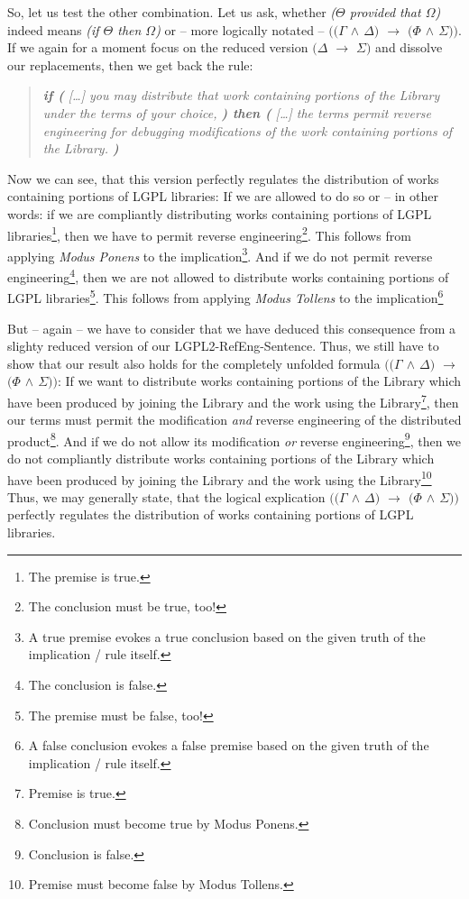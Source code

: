 So, let us test the other combination. Let us ask, whether \emph{($\Theta$
provided that $\Omega$)} indeed means \emph{(if $\Theta$ then $\Omega$)} or --
more logically notated -- \emph{$((\Gamma$ $\wedge$ $\Delta)$ $\rightarrow$ $(\Phi$
$\wedge$ $\Sigma))$}. If we again for a moment focus on the reduced version
\emph{$(\Delta$ $\rightarrow$ $\Sigma)$} and dissolve our replacements, then we
get back the rule:

\begin{quote}\noindent\emph{\textbf{if (} [\ldots] you may distribute that work
containing portions of the Library under the terms of your choice, \textbf{)
then (} [\ldots] the terms permit reverse engineering for debugging
modifications of the work containing portions of the Library.
\textbf{)}}\end{quote}

Now we can see, that this version perfectly regulates the distribution of works
containing portions of LGPL libraries: If we are allowed to do so or -- in other
words: if we are compliantly distributing works containing portions of LGPL
libraries\footnote{The premise is true.}, then we have to permit reverse
engineering\footnote{The conclusion must be true, too!}. This follows from
applying \emph{Modus Ponens} to the implication\footnote{A true premise evokes a
true conclusion based on the given truth of the implication / rule itself.}. And
if we do not permit reverse engineering\footnote{The conclusion is false.}, then
we are not allowed to distribute works containing portions of LGPL
libraries\footnote{The premise must be false, too!}. This follows from applying
\emph{Modus Tollens} to the implication\footnote{A false conclusion evokes a
false premise based on the given truth of the implication / rule itself.}

But -- again -- we have to consider that we have deduced this consequence from a
slighty reduced version of our LGPL2-RefEng-Sentence. Thus, we still have to
show that our result also holds for the completely unfolded formula
\emph{$((\Gamma$ $\wedge$ $\Delta)$ $\rightarrow$ $(\Phi$ $\wedge$ $\Sigma))$}:
If we want to distribute works containing portions of the Library which have
been produced by joining the Library and the work using the
Library\footnote{Premise is true.}, then our terms must permit the modification
\emph{and} reverse engineering of the distributed product\footnote{Conclusion
must become true by Modus Ponens.}. And if we do not allow its modification
\emph{or} reverse engineering\footnote{Conclusion is false.}, then we do not
compliantly distribute works containing portions of the Library which have been
produced by joining the Library and the work using the Library\footnote{Premise
must become false by Modus Tollens.} Thus, we may generally state, that the
logical explication \emph{$((\Gamma$ $\wedge$ $\Delta)$ $\rightarrow$ $(\Phi$
$\wedge$ $\Sigma))$} perfectly regulates the distribution of works containing
portions of LGPL libraries.

